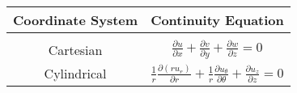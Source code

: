 \begin{table}[h]
    \centering
    \begin{tabular}{cc}
        \toprule
        Coordinate System & Continuity Equation \\
        \hline \\[-1ex]
        Cartesian & \(\displaystyle \frac{\partial u}{\partial x} + \frac{\partial v}{\partial y} + \frac{\partial w}{\partial z} = 0\) \\[3ex]
        Cylindrical & \(\displaystyle \frac{1}{r} \frac{\partial (r u_r)}{\partial r} + \frac{1}{r} \frac{\partial u_{\theta}}{\partial \theta} + \frac{\partial u_z}{\partial z} = 0\) \\[3ex]
        \bottomrule
    \end{tabular}
\end{table}


